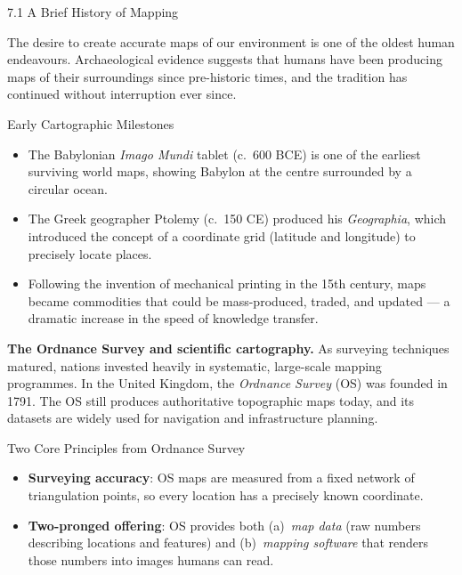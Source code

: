 \documentclass[aspectratio=169,10pt]{beamer}
\begin{document}
\begin{frame}[allowframebreaks]{7.1 A Brief History of Mapping}

  The desire to create accurate maps of our environment is one of the
  oldest human endeavours.  Archaeological evidence suggests that
  humans have been producing maps of their surroundings since
  pre-historic times, and the tradition has continued without
  interruption ever since.

  \begin{block}{Early Cartographic Milestones}
    \begin{itemize}
      \item The Babylonian \emph{Imago Mundi} tablet (c.\ 600 BCE) is one of
            the earliest surviving world maps, showing Babylon at the centre
            surrounded by a circular ocean.
      \item The Greek geographer Ptolemy (c.\ 150 CE) produced his
            \emph{Geographia}, which introduced the concept of a coordinate
            grid (latitude and longitude) to precisely locate places.
      \item Following the invention of mechanical printing in the 15th century,
            maps became commodities that could be mass-produced, traded, and
            updated — a dramatic increase in the speed of knowledge transfer.
    \end{itemize}
  \end{block}

  \framebreak

  \textbf{The Ordnance Survey and scientific cartography.}
  As surveying techniques matured, nations invested heavily in
  systematic, large-scale mapping programmes.  In the United Kingdom,
  the \emph{Ordnance Survey} (OS) was founded in 1791.  The OS still
  produces authoritative topographic maps today, and its datasets are
  widely used for navigation and infrastructure planning.

  \begin{block}{Two Core Principles from Ordnance Survey}
    \begin{itemize}
      \item \textbf{Surveying accuracy}: OS maps are measured from a fixed
            network of triangulation points, so every location has a
            precisely known coordinate.
      \item \textbf{Two-pronged offering}: OS provides both
            (a)~\emph{map data} (raw numbers describing locations and
            features) and
            (b)~\emph{mapping software} that renders those numbers into
            images humans can read.
    \end{itemize}
  \end{block}


\end{frame}
\end{document}
